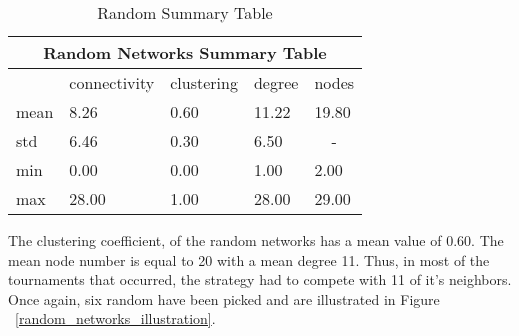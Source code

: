 \begin{table}[!hbtp]
	\centering
	\begin{adjustbox}{width=0.5\textwidth}
		\small
		\begin{tabular}{|l|l|l|l|l|}
			\hline
			\multicolumn{5}{|c|}{Random Networks Summary Table}                       \\ \hline
			     & connectivity & clustering & degree & nodes                  \\ \hline
			mean & 8.26         & 0.60       & 11.22  & 19.80                  \\ \hline
			std  & 6.46         & 0.30       & 6.50   & \multicolumn{1}{c|}{-} \\ \hline
			min  & 0.00         & 0.00       & 1.00   & 2.00                   \\ \hline
			max  & 28.00        & 1.00       & 28.00  & 29.00                  \\ \hline
		\end{tabular}
	\end{adjustbox}
	\caption{Random Summary Table}
	\label{table:binomial-summary-table}
\end{table}

The clustering coefficient, of the random networks has a mean value of 0.60. The
mean node number is equal to 20 with a mean degree 11. Thus, in most of the
tournaments that occurred, the strategy had to compete with 11 of it's neighbors.
Once again, six random have been picked and are illustrated in Figure ~\ref{random_networks_illustration}.

